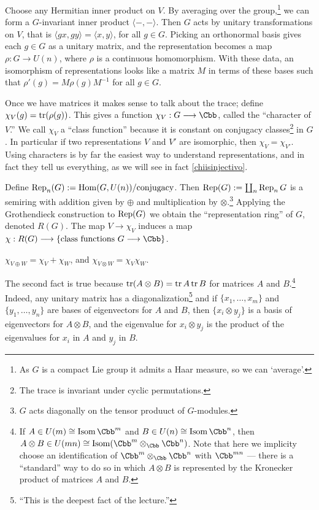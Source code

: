 Choose any Hermitian inner product on $V$.  By averaging over the group,\footnote{As $G$ is a compact Lie group it admits a Haar measure, so we can `average'.} we can form a $G$-invariant inner product $\langle - , - \rangle$. Then $G$ acts by unitary transformations on $V$, that is $\langle gx, gy \rangle = \langle x, y \rangle$, for all $g\in G$.  Picking an orthonormal basis gives each $g\in G$ as a unitary matrix, and the representation becomes a map $\rho: G \to U(n)$, where $\rho$ is a continuous homomorphism.  With these data, an isomorphism of representations looks like a matrix $M$ in terms of these bases such that $\rho'(g) = M \rho(g) M^{-1}$ for all $g \in G$.

Once we have matrices it makes sense to talk about the trace; define $\chi_V(g) = \operatorname{tr}(\rho(g))$.  This gives a function $\chi_V: G \to \Cbb$, called the ``character of $V$.''  We call $\chi_V$ a ``class function'' because it is constant on conjugacy classes\footnote{The trace is invariant under cyclic permutations.} in $G$.  In particular if two representations $V$ and $V'$ are isomorphic, then $\chi_V = \chi_{V'}$.
Using characters is by far the easiest way to understand representations, and in fact they tell us everything, as we will see in fact \ref{chiisinjectivo}.

Define $\operatorname{Rep}_n(G) \mathrel{:=} \operatorname{Hom}(G, U(n)) /\textup{conjugacy}$.  Then $\operatorname{Rep}(G) \mathrel{:=} \coprod_n \operatorname{Rep}_n G$ is a semiring with addition given by $\oplus$ and multiplication by $\otimes$.\footnote{$G$ acts diagonally on the tensor produuct of $G$-modules.} Applying the Grothendieck construction to $\operatorname{Rep}(G)$ we obtain the ``representation ring'' of $G$, denoted $R(G)$.  The map $V \to \chi_V$ induces a map $\chi: R(G) \to \{\hbox{class functions $G \to \Cbb$}\}$.

\begin{fact}
$\chi_{V \oplus W} = \chi_V + \chi_W$, and $\chi_{V \otimes W} = \chi_V \chi_W$.
\end{fact}
The second fact is true because $\operatorname{tr}(A \otimes B) = \operatorname{tr} A \operatorname{tr} B$ for matrices $A$ and $B$.\footnote{If $A \in U(m) \cong \operatorname{Isom} \Cbb^m$ and $B \in U(n) \cong \operatorname{Isom} \Cbb^n$, then $A \otimes B \in U(mn) \cong \operatorname{Isom} (\Cbb^m \otimes_\Cbb \Cbb^n)$. Note that here we implicity choose an identification of $\Cbb^m\otimes_\Cbb\Cbb^n$ with $\Cbb^{mn}$ --- there is a ``standard'' way to do so in which $A\otimes B$ is represented by the Kronecker product of matrices $A$ and $B$.}  Indeed, any unitary matrix has a diagonalization\footnote{``This is the deepest fact of the lecture.''} and if $\{x_1, \ldots, x_m\}$ and $\{y_1, \ldots, y_n\}$ are bases of eigenvectors for $A$ and $B$, then $\{x_i \otimes y_j\}$ is a basis of eigenvectors for $A \otimes B$, and the eigenvalue for $x_i \otimes y_j$ is the product of the eigenvalues for $x_i$ in $A$ and $y_j$ in $B$.

